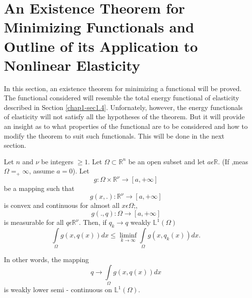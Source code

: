 \section[An Existence Theorem for Minimizing Functionals.....]{An Existence Theorem for Minimizing Functio\-nals and Outline
  of its Application to Nonlinear Elasticity}\label{chap2-sec2.5}%


In this section, an existence theorem for minimizing a functional will
be proved. The functional considered will resemble the total energy
functional of elasticity described in Section \ref{chap1-sec1.4}. Unfornately,
however, the energy functionals of elasticity will not satisfy all the
hypotheses of the theorem. But it will provide an insight as to what
properties of the functional are to be considered and how to modify
the theorem to suit such functionals. This will be done in the next
section. 

\begin{theorem}\label{chap2-thm2.5.1}%
  Let $n$ and $\nu$ be integers $\ge 1$. Let $\Omega \subset
  \mathbb{R}^n$ be an open subset and let $a \epsilon
  \mathbb{R}$. (If ,meas $\Omega = _ + \infty$, assume $a = 0$). Let  
  $$
  g : \Omega \times \mathbb{R}^\nu \rightarrow [a, + \infty]
  $$ 
  be a mapping such that 
  $$
  g(x,.): \mathbb{R}^\nu \rightarrow [a, + \infty]
  $$
  is convex and continuous for almost all $x \epsilon \Omega$;,
  $$
  g(., q) : \Omega \rightarrow [a, + \infty]
  $$
  is measurable for all $q \epsilon \mathbb{R}^\nu$. Then, if $q_k
  \rightarrow q$ weakly $\mathbb{L}^1(\Omega)$ 
  \begin{equation*}
    \int \limits_\Omega g(x,q(x))dx \le \liminf_{k \rightarrow \infty}
    \int \limits_{\Omega} g(x, q_k (x))dx. \tag{2.5-1} \label{eq2.5-1}
  \end{equation*}\pageoriginale

In other words, the mapping
$$
q \rightarrow \int \limits_\Omega g(x , q(x))dx 
$$
is weakly lower semi - continuous on $\mathbb{L}^1 (\Omega)$.
\end{theorem}

